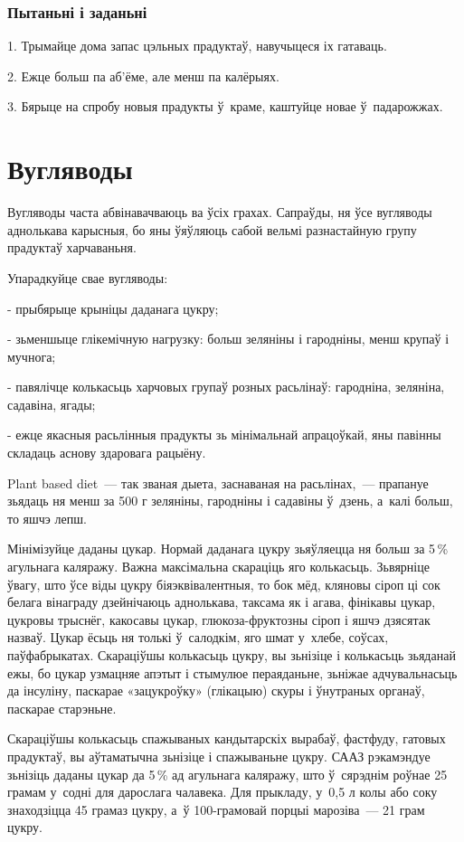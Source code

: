 \subsubsection{Пытаньні і заданьні}

1. Трымайце дома запас цэльных прадуктаў, навучыцеся іх гатаваць.

2. Ежце больш па аб'ёме, але менш па калёрыях.

3. Бярыце на спробу новыя прадукты ў~краме, каштуйце новае ў~падарожжах.


\section{Вугляводы}

Вугляводы часта абвінавачваюць ва ўсіх грахах. Сапраўды, ня ўсе вугляводы аднолькава карысныя, бо яны ўяўляюць сабой вельмі разнастайную групу прадуктаў харчаваньня.

Упарадкуйце свае вугляводы:

- прыбярыце крыніцы даданага цукру;

- зьменшыце глікемічную нагрузку: больш зеляніны і гародніны, менш крупаў і мучнога;

- павялічце колькасьць харчовых групаў розных расьлінаў: гародніна, зеляніна, садавіна, ягады;

- ежце якасныя расьлінныя прадукты зь мінімальнай апрацоўкай, яны павінны складаць аснову здаровага рацыёну.

Plant based diet~--- так званая дыета, заснаваная на расьлінах,~--- прапануе зьядаць ня менш за 500 г зеляніны, гародніны і садавіны ў~дзень, а~калі больш, то яшчэ лепш.

Мінімізуйце даданы цукар. Нормай даданага цукру зьяўляецца ня больш за 5\,\% агульнага каляражу. Важна максімальна скараціць яго колькасьць. Зьвярніце ўвагу, што ўсе віды цукру біяэквівалентныя, то бок мёд, кляновы сіроп ці сок белага вінаграду дзейнічаюць аднолькава, таксама як і агава, фінікавы цукар, цукровы трыснёг, какосавы цукар, глюкоза-фруктозны сіроп і яшчэ дзясятак назваў. Цукар ёсьць ня толькі ў~салодкім, яго шмат у~хлебе, соўсах, паўфабрыкатах. Скараціўшы колькасьць цукру, вы зьнізіце і колькасьць зьяданай ежы, бо цукар узмацняе апэтыт і стымулюе пераяданьне, зьніжае адчувальнасьць да інсуліну, паскарае «зацукроўку» (глікацыю) скуры і ўнутраных органаў, паскарае старэньне.

Скараціўшы колькасьць спажываных кандытарскіх вырабаў, фастфуду, гатовых прадуктаў, вы аўтаматычна зьнізіце і спажываньне цукру. СААЗ рэкамэндуе зьнізіць даданы цукар да 5\,\% ад агульнага каляражу, што ў~сярэднім роўнае 25 грамам у~содні для дарослага чалавека. Для прыкладу, у~0,5 л колы або соку знаходзіцца 45 грамаз цукру, а~ў 100-грамовай порцыі марозіва~--- 21 грам цукру.


